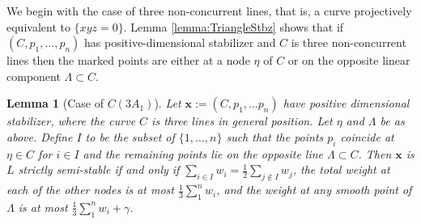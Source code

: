\documentclass{amsart}
\numberwithin{equation}{section}
\newtheorem{lemma}[prop]{Lemma}
\theoremstyle{definition}
\begin{document}
We begin with the case of three non-concurrent lines, that is, a curve projectively equivalent to $\{xyz=0\}$. Lemma \ref{lemma:TriangleStbz} shows that if $(C, p_1, \dots , p_n)$ has positive-dimensional stabilizer and $C$ is three non-concurrent lines then the marked points are either at a node $\eta$ of $C$ or on the opposite linear component $\Lambda \subset C$.


\begin{lemma}[Case of $C(3A_1)$]
\label{lemma:Wall_3distinctlines}
    Let $\mathbf{x}:=(C, p_1, \dots p_n)$ have positive dimensional stabilizer, where the curve $C$ is three lines in general position. Let $\eta$ and $\Lambda$ be as above. Define $I$ to be the subset of $\{1, \dots , n\}$ such that the points $p_i$ coincide at $\eta \in C$ for $i \in I$ and the remaining points lie on the opposite line $\Lambda \subset C$. Then $\mathbf{x}$ is $L$ strictly semi-stable if and only if $\sum_{i \in I}w_i = \frac{1}{2} \sum_{j \notin I} w_j$, the total weight at each of the other nodes is at most $\frac{1}{3} \sum_1^n w_i$, and the weight at any smooth point of $\Lambda$  is at most $\frac{1}{3}\sum_1^n w_i + \gamma $.

    
\end{lemma}
\end{document}
